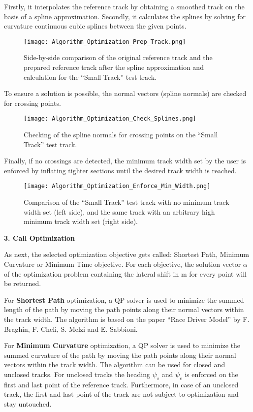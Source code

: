 Firstly, it interpolates the reference track by obtaining a smoothed track on the basis of a spline approximation. Secondly, it calculates the splines by solving for curvature continuous cubic splines between the given points.
\begin{figure}[H]
    \centering
    \texttt{[image: Algorithm\_Optimization\_Prep\_Track.png]}
    \caption{Side-by-side comparison of the original reference track and the prepared reference track after the spline approximation and calculation for the ``Small Track'' test track.}
    \label{fig:Optimization Algorithm Prepare Track}
\end{figure}
To ensure a solution is possible, the normal vectors (spline normals) are checked for crossing points.
\begin{figure}[H]
    \centering
    \texttt{[image: Algorithm\_Optimization\_Check\_Splines.png]}
    \caption{Checking of the spline normals for crossing points on the ``Small Track'' test track.}
    \label{fig:Optimization Algorithm Check Spline Normals for Crossing Points}
\end{figure}
Finally, if no crossings are detected, the minimum track width set by the user is enforced by inflating tighter sections until the desired track width is reached.
\begin{figure}[H]
    \centering
    \texttt{[image: Algorithm\_Optimization\_Enforce\_Min\_Width.png]}
    \caption{Comparison of the ``Small Track'' test track with no minimum track width set (left side), and the same track with an arbitrary high minimum track width set (right side).}
    \label{fig:Optimization Algorithm Check Spline Normals for Crossing Points}
\end{figure}

\textbf{3. Call Optimization}

As next, the selected optimization objective gets called: Shortest Path, Minimum Curvature or Minimum Time objective. For each objective, the solution vector $\alpha$ of the optimization problem containing the lateral shift in m for every point will be returned.

For \textbf{Shortest Path} optimization, a QP solver is used to minimize the summed length of the path by moving the path points along their normal vectors within the track width. The algorithm is based on the paper ``Race Driver Model'' by F. Braghin, F. Cheli, S. Melzi and E. Sabbioni. \cite{shortest_path}

For \textbf{Minimum Curvature} optimization, a QP solver is used to minimize the summed curvature of the path by moving the path points along their normal vectors within the track width. The algorithm can be used for closed and unclosed tracks. For unclosed tracks the heading $\psi_s$ and $\psi_e$ is enforced on the first and last point of the reference track. Furthermore, in case of an unclosed track, the first and last point of the track are not subject to optimization and stay untouched. \cite{minimum_curvature_trajectory_planning}

